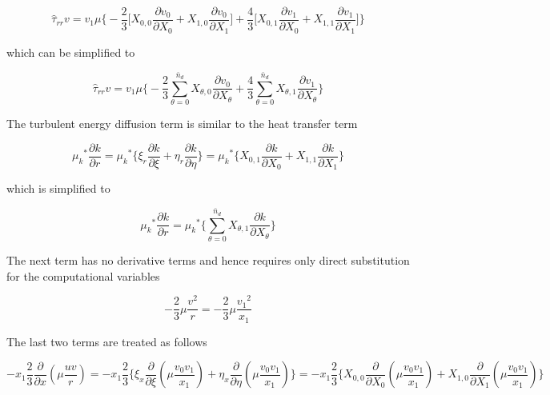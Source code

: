 \begin{displaymath}
	\hat{ \tau}_{rr}v = v_1\mu\Big\{-\frac{2}{3}\Big[
	X_{0,0}\frac{\partial v_0}{\partial X_0} + X_{1,0}\frac{\partial v_0}{\partial X_1}\Big] + \frac{4}{3}\Big[
	X_{0,1}\frac{\partial v_1}{\partial X_0} + X_{1,1}\frac{\partial v_1}{\partial X_1}\Big] \Big\} 
\end{displaymath}

	which can be simplified to

\begin{equation}
	\hat{ \tau}_{rr}v = v_1\mu\Big\{-\frac{2}{3}\sum_{\theta = 0}^{\bar{n}_d}X_{\theta,0}
	\frac{\partial v_0}{\partial X_\theta} + \frac{4}{3}\sum_{\theta = 0}^{\bar{n}_d}X_{\theta,1}
	\frac{\partial v_1}{\partial X_\theta} \Big\}	
\label{eqn:energyD}
\end{equation}

	The turbulent energy diffusion term is similar to the heat transfer term

\begin{displaymath}
	{\mu_k}^* \frac{\partial k}{\partial r} = {\mu_k}^* \Big\{\xi_r\frac{\partial k}{\partial \xi} 
	+ \eta_r\frac{\partial k}{\partial \eta}\Big\} = {\mu_k}^* \Big\{X_{0,1}\frac{\partial k}{\partial X_0}
	+ X_{1,1}\frac{\partial k}{\partial X_1}\Big\}
\end{displaymath}	

	which is simplified to

\begin{equation}
	{\mu_k}^* \frac{\partial k}{\partial r} = {\mu_k}^* \Big\{\sum_{\theta = 0}^{\bar{n}_d}X_{\theta,1}
	\frac{\partial k}{\partial X_\theta}\Big\}
\label{eqn:energyE}
\end{equation}

	The next term has no derivative terms and hence requires only direct substitution for the computational 
variables

\begin{equation}
	- \frac{2}{3}\mu\frac{v^2}{r} = - \frac{2}{3}\mu\frac{{v_1}^2}{x_1}
\label{eqn:energyF}
\end{equation}

	The last two terms are treated as follows

\begin{displaymath}
	- x_1\frac{2}{3}\frac{\partial}{\partial x}(\mu \frac{uv}{r}) = -x_1\frac{2}{3}\Big\{\xi_x
	\frac{\partial}{\partial \xi}(\mu\frac{v_0 v_1}{x_1}) + \eta_x\frac{\partial}{\partial \eta}
	(\mu\frac{v_0 v_1}{x_1})\Big\} = -x_1\frac{2}{3}\Big\{X_{0,0}
	\frac{\partial}{\partial X_0}(\mu\frac{v_0 v_1}{x_1}) + X_{1,0}\frac{\partial}{\partial X_1}
	(\mu\frac{v_0 v_1}{x_1})\Big\}	
\end{displaymath}

